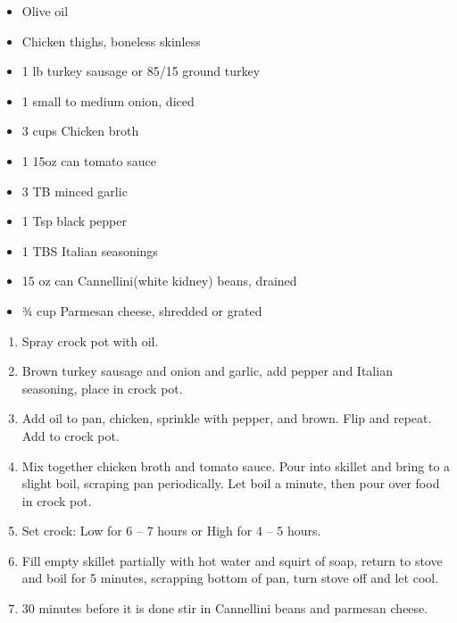
\ingredients
\begin{itemize}
        \item Olive oil
        \item Chicken thighs, boneless skinless
        \item 1 lb turkey sausage or 85/15 ground turkey
        \item 1 small to medium onion, diced
        \item 3 cups Chicken broth
        \item 1 15oz can tomato sauce
        \item 3 TB minced garlic
        \item 1 Tsp black pepper
        \item 1 TBS Italian seasonings
        \item 15 oz can Cannellini(white kidney) beans, drained
        \item ¾ cup Parmesan cheese, shredded or grated
\end{itemize}

\instructions
\begin{enumerate}
\def\labelenumi{\arabic{enumi}.}
\item
  Spray crock pot with oil.
\item
  Brown turkey sausage and onion and garlic, add pepper and Italian
  seasoning, place in crock pot.
\item
  Add oil to pan, chicken, sprinkle with pepper, and brown. Flip and
  repeat. Add to crock pot.
\item
  Mix together chicken broth and tomato sauce. Pour into skillet and
  bring to a slight boil, scraping pan periodically. Let boil a minute,
  then pour over food in crock pot.
\item
  Set crock: Low for 6 -- 7 hours or High for 4 -- 5 hours.
\item
  Fill empty skillet partially with hot water and squirt of soap, return
  to stove and boil for 5 minutes, scrapping bottom of pan, turn stove
  off and let cool.
\item
  30 minutes before it is done stir in Cannellini beans and parmesan
  cheese.
\end{enumerate}
